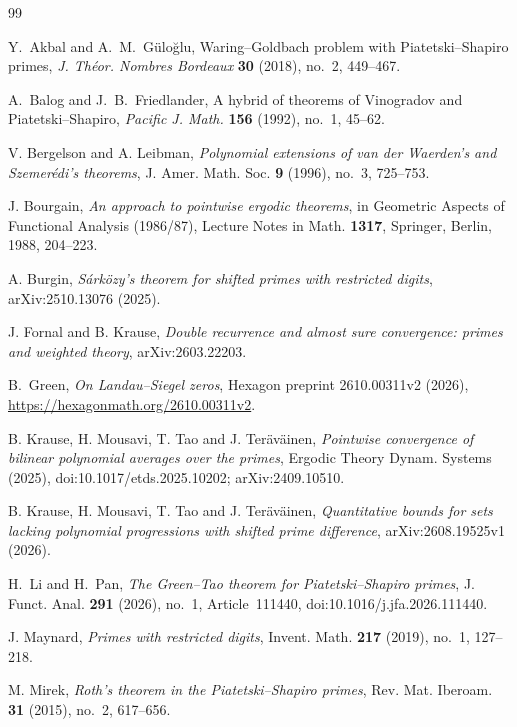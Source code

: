 \documentclass[12pt]{amsart}
\newcommand{\1}{\mathbf 1}
\begin{document}
\begin{thebibliography}{99}
\raggedright

Y.~Akbal and A.~M.~G\"ulo\u{g}lu,
Waring--Goldbach problem with Piatetski--Shapiro primes,
\emph{J. Th\'eor. Nombres Bordeaux} \textbf{30} (2018),
no.~2, 449--467.


A.~Balog and J.~B.~Friedlander,
A hybrid of theorems of Vinogradov and Piatetski--Shapiro,
\emph{Pacific J. Math.} \textbf{156} (1992), no.~1, 45--62.

V. Bergelson and A. Leibman,
\emph{Polynomial extensions of van der Waerden's and Szemer\'edi's
theorems},
J. Amer. Math. Soc. \textbf{9} (1996), no.~3, 725--753.

J. Bourgain,
\emph{An approach to pointwise ergodic theorems},
in Geometric Aspects of Functional Analysis (1986/87),
Lecture Notes in Math. \textbf{1317},
Springer, Berlin, 1988, 204--223.

A. Burgin,
\emph{S\'ark\"ozy's theorem for shifted primes with restricted digits},
arXiv:2510.13076 (2025).

J. Fornal and B. Krause,
\emph{Double recurrence and almost sure convergence:
primes and weighted theory},
arXiv:2603.22203.

B.~Green,
\emph{On Landau--Siegel zeros},
Hexagon preprint 2610.00311v2 (2026),
\url{https://hexagonmath.org/2610.00311v2}.

B. Krause, H. Mousavi, T. Tao and J. Ter\"av\"ainen,
\emph{Pointwise convergence of bilinear polynomial averages over the primes},
Ergodic Theory Dynam. Systems (2025),
doi:10.1017/etds.2025.10202; arXiv:2409.10510.


B. Krause, H. Mousavi, T. Tao and J. Ter\"av\"ainen,
\emph{Quantitative bounds for sets lacking polynomial progressions with
shifted prime difference},
arXiv:2608.19525v1 (2026).

H.~Li and H.~Pan,
\emph{The Green--Tao theorem for Piatetski--Shapiro primes},
J. Funct. Anal. \textbf{291} (2026), no.~1,
Article~111440, doi:10.1016/j.jfa.2026.111440.


J. Maynard,
\emph{Primes with restricted digits},
Invent. Math. \textbf{217} (2019), no.~1, 127--218.


M. Mirek,
\emph{Roth's theorem in the Piatetski--Shapiro primes},
Rev. Mat. Iberoam. \textbf{31} (2015), no.~2, 617--656.


\end{thebibliography}
\end{document}
